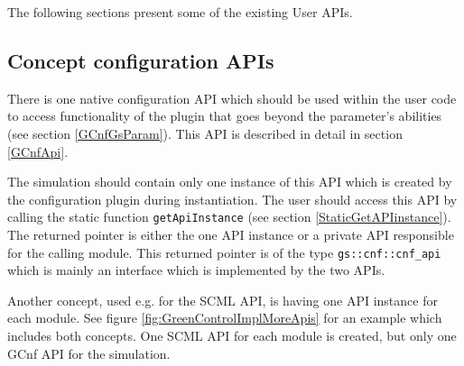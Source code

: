 The following sections present some of the existing User APIs.

\subsection{Concept configuration APIs}
\label{GCnfConceptConfigurationApi}
There is one native configuration \GreenConfig API which should be used within the user code to access functionality of the plugin that goes beyond the parameter's abilities (see section \ref{GCnfGsParam}). This API is described in detail in section \ref{GCnfApi}.

The simulation should contain only one instance of this API which is created by the configuration plugin during instantiation. The user should access this API by calling the static function  \lstinline|getApiInstance| (see section \ref{StaticGetAPIinstance}). The returned pointer is either the one API instance or a private API responsible for the calling module. This returned pointer is of the type \lstinline|gs::cnf::cnf_api| which is mainly an interface which is implemented by the two APIs.



Another concept, used e.g. for the SCML API, is having one API instance for each module.
See figure \ref{fig:GreenControlImplMoreApis} for an example which includes both concepts. One SCML API for each module is created, but only one GCnf API for the simulation.


